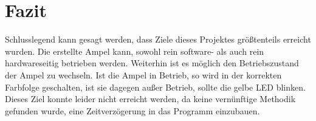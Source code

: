 \chapter{Fazit}
Schlusslegend kann gesagt werden, dass Ziele dieses Projektes größtenteils erreicht wurden. Die erstellte Ampel kann, sowohl rein software- als auch rein hardwareseitig betrieben werden. Weiterhin ist es möglich den Betriebszustand der Ampel zu wechseln. Ist die Ampel in Betrieb, so wird in der korrekten Farbfolge geschalten, ist sie dagegen außer Betrieb, sollte die gelbe LED blinken. Dieses Ziel konnte leider nicht erreicht werden, da keine vernünftige Methodik gefunden wurde, eine Zeitverzögerung in das Programm einzubauen. 


